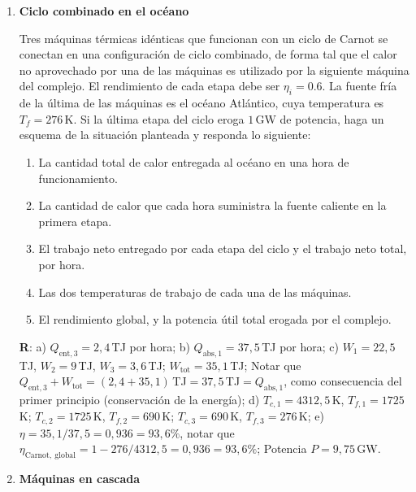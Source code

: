 \documentclass[a4paper,12pt]{article}
\begin{document}
\begin{enumerate}
	\item {\bf{Ciclo combinado en el océano}} 
		
		Tres máquinas térmicas idénticas que funcionan con un ciclo de Carnot
		se conectan en una configuración de ciclo combinado, de forma tal que
		el calor no aprovechado por una de las máquinas es utilizado por la
		siguiente máquina del complejo.  El rendimiento de cada etapa debe ser
		$\eta_i=0.6$. La fuente fría de la última de las máquinas es el océano
		Atlántico, cuya temperatura es $T_f=276$\,K. Si la última etapa del
		ciclo eroga $1$\,GW de potencia, haga un esquema de la situación
		planteada y responda lo siguiente:
		\begin{enumerate} 
			\item La cantidad total de calor entregada al océano en una hora de
				funcionamiento.
			\item La cantidad de calor que cada hora suministra la fuente
				caliente en la primera etapa.
			\item El trabajo neto entregado por cada etapa del ciclo y el
				trabajo neto total, por hora.
			\item Las dos temperaturas de trabajo de cada una de las máquinas.
			\item El rendimiento global, y la potencia útil total erogada por
				el complejo.
		\end{enumerate}
		{\bf{R}}: a) $Q_{\mathrm{ent,3}}=2,4$\,TJ por hora; b) $Q_{\mathrm{abs,1}}=37,5$\,TJ por hora; c) $W_1=22,5$\,TJ, $W_2=9$\,TJ, $W_3=3,6$\,TJ; $W_{\mathrm{tot}}=35,1$\,TJ; Notar que $Q_{\mathrm{ent,3}} + W_{\mathrm{tot}} = (2,4 + 35,1)$\,TJ$=37,5$\,TJ$=Q_{\mathrm{abs,1}}$, como consecuencia del primer principio (conservación de la energía); d) $T_{c,1} = 4312,5$\,K, $T_{f,1} = 1725$\,K; $T_{c,2} = 1725$\,K, $T_{f,2} = 690$\,K; $T_{c,3} = 690$\,K, $T_{f,3} = 276$\,K; e) $\eta=35,1/37,5=0,936=93,6\%$, notar que $\eta_{\mathrm{Carnot,\ global}} = 1 - 276/4312,5=0,936=93,6\%$; Potencia $P=9,75$\,GW.
	\item {\bf{Máquinas en cascada}}
		

\end{enumerate}
\end{document}
